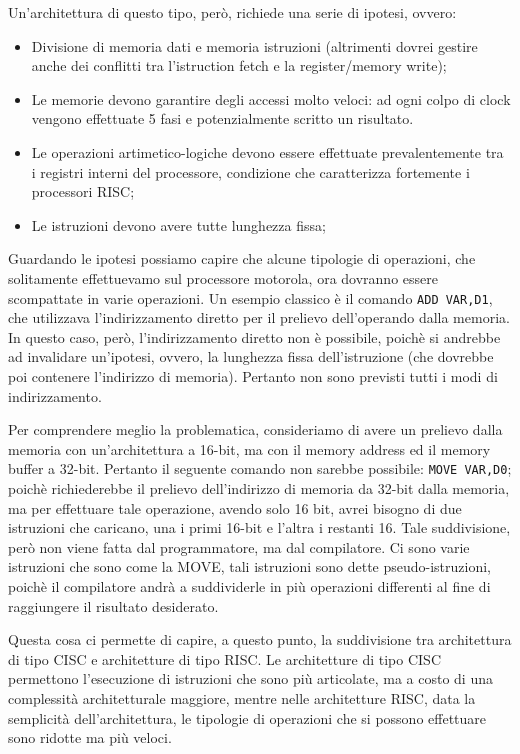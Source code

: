 Un'architettura di questo tipo, però, richiede una serie di ipotesi, ovvero:
\begin{itemize}
    \item Divisione di memoria dati e memoria istruzioni (altrimenti dovrei gestire anche dei conflitti tra l'istruction fetch e la register/memory write);
    \item Le memorie devono garantire degli accessi molto veloci: ad ogni colpo di clock vengono effettuate 5 fasi e potenzialmente scritto un risultato.
    \item Le operazioni artimetico-logiche devono essere effettuate prevalentemente tra i registri interni del processore, condizione che caratterizza fortemente i processori RISC;
    \item Le istruzioni devono avere tutte lunghezza fissa;
\end{itemize}

Guardando le ipotesi possiamo capire che alcune tipologie di operazioni, che solitamente effettuevamo sul processore motorola, ora dovranno essere scompattate in varie operazioni. Un esempio classico è il comando \lstinline|ADD VAR,D1|, che utilizzava l'indirizzamento diretto per il prelievo dell'operando dalla memoria. In questo caso, però, l'indirizzamento diretto non è possibile, poichè si andrebbe ad invalidare un'ipotesi, ovvero, la lunghezza fissa dell'istruzione (che dovrebbe poi contenere l'indirizzo di memoria). Pertanto non sono previsti tutti i modi di indirizzamento.

Per comprendere meglio la problematica, consideriamo di avere un prelievo dalla memoria con un'architettura a 16-bit, ma con il memory address ed il memory buffer a 32-bit. Pertanto il seguente comando non sarebbe possibile: \lstinline|MOVE VAR,D0|; poichè richiederebbe il prelievo dell'indirizzo di memoria da 32-bit dalla memoria, ma per effettuare tale operazione, avendo solo 16 bit, avrei bisogno di due istruzioni che caricano, una i primi 16-bit e l'altra i restanti 16. Tale suddivisione, però non viene fatta dal programmatore, ma dal compilatore. Ci sono varie istruzioni che sono come la MOVE, tali istruzioni sono dette pseudo-istruzioni, poichè il compilatore andrà a suddividerle in più operazioni differenti al fine di raggiungere il risultato desiderato.

Questa cosa ci permette di capire, a questo punto, la suddivisione tra architettura di tipo CISC e architetture di tipo RISC. Le architetture di tipo CISC permettono l'esecuzione di istruzioni che sono più articolate, ma a costo di una complessità architetturale maggiore, mentre nelle architetture RISC, data la semplicità dell'architettura, le tipologie di operazioni che si possono effettuare sono ridotte ma più veloci.

